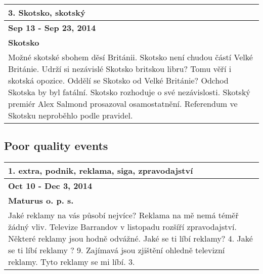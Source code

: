 \begin{tabularx}{\linewidth}{p{\linewidth}} \toprule[1.5pt]
\bf 3. Skotsko, skotský \\ \midrule
\bf Sep 13 - Sep 23, 2014 \\ \midrule
\bf Skotsko \\
Možné skotské sbohem děsí Británii. Skotsko není chudou částí Velké Británie. Udrží si nezávislé Skotsko britskou libru? Tomu věří i skotská opozice. Oddělí se Skotsko od Velké Británie? Odchod Skotska by byl fatální. Skotsko rozhoduje o své nezávislosti. Skotský premiér Alex Salmond prosazoval osamostatnění. Referendum ve Skotsku neproběhlo podle pravidel. \\ \bottomrule[1.25pt]
\end{tabularx}
\hspace{\fill}

\subsection*{Poor quality events}

\begin{tabularx}{\linewidth}{p{\linewidth}} \toprule[1.5pt]
\bf 1. extra, podnik, reklama, siga, zpravodajství \\ \midrule
\bf Oct 10 - Dec 3, 2014 \\ \midrule
\bf Maturus o. p. s. \\
Jaké reklamy na vás působí nejvíce? Reklama na mě nemá téměř žádný vliv. Televize Barrandov v listopadu rozšíří zpravodajství. Některé reklamy jsou hodně odvážné. Jaké se ti líbí reklamy? 4. Jaké se ti líbí reklamy ? 9. Zajímavá jsou zjištění ohledně televizní reklamy. Tyto reklamy se mi líbí. 3. \\ \bottomrule[1.25pt]
\end{tabularx}

\hspace{\fill}

